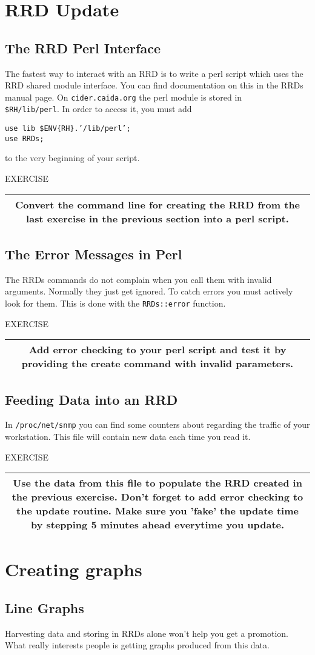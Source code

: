 \documentclass[a4paper,12pt]{article}
\newenvironment{work}{\textsf{\tiny EXERCISE}\nopagebreak\\[0.3ex]\begin{tabular}{|c|}
 \hline
 \begin{minipage}{0.965\linewidth}%
 \setlength{\parskip}{1.6ex plus 0.6ex minus 0.4ex}%
 \rule{0pt}{2.8ex}\ignorespaces}
{\rule[-1.8ex]{0pt}{0pt}\end{minipage}\\
 \hline
 \end{tabular}}
\newcommand{\ex}[1]{\subsection{#1}}
\newcommand{\cmd}[1]{\texttt{\mbox{#1}}}
\begin{document}
\newpage
\section{RRD Update}
\ex{The RRD Perl Interface}

The fastest way to interact with an RRD is to write a perl script
which uses the RRD shared module interface. You can find documentation
on this in the RRDs manual page. On \cmd{cider.caida.org} the perl module is
stored in\\ \cmd{\$RH/lib/perl}. In order to access it, you must
add 

\cmd{use lib \$ENV\{RH\}.'/lib/perl';}\\
\cmd{use RRDs;}


to the very beginning of your script.

\begin{work}
Convert the command line for creating the RRD from the last exercise
in the previous section into a perl script.
\end{work}

\ex{The Error Messages in Perl}
The RRDs commands do not complain when you call them with invalid
arguments. Normally they just get ignored. To catch errors you must
actively look for them. This is done with the \cmd{RRDs::error}
function.

\begin{work}
Add error checking to your perl script and test it by providing the
create command with invalid parameters.
\end{work}

\newpage
\ex{Feeding Data into an RRD}
In \cmd{/proc/net/snmp} you can find some counters about regarding the
traffic of your workstation. This file will contain new data each time you read it.

\begin{work}
  Use the data from this file to populate the RRD created in the previous
  exercise. Don't forget to add error checking to the update routine. Make
  sure you 'fake' the update time by stepping 5 minutes ahead everytime you
  update.
\end{work}

\section{Creating graphs}

\ex{Line Graphs}
Harvesting data and storing in RRDs alone won't help you get a
promotion. What really interests people is getting graphs produced from
this data.
\end{document}
